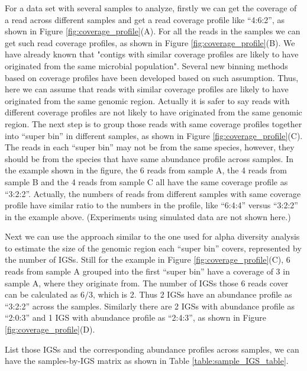 For a data set with several samples to analyze, firstly we can get the coverage of a read across different samples and get a read coverage
profile like ``4:6:2'', as shown in Figure \ref{fig:coverage_profile}(A). 
For all the reads in the samples we can get such read coverage profiles, as 
shown in Figure \ref{fig:coverage_profile}(B). 
We have already known that "contigs with similar coverage profiles are likely
to have originated from the same microbial population"\cite{Imelfort2014}.
Several new binning methods based on coverage profiles have been developed
based on such assumption\cite{Albertsen2013,Karlsson2013,Alneberg2014,Nielsen2014,Imelfort2014}.
Thus, here we can assume that reads with similar coverage profiles are 
likely to have originated from the same genomic region. Actually it is safer to 
say reads with different coverage profiles are not likely to have originated from
the same genomic region. The next step is to group those reads with same
coverage profiles together into ``super bin'' in different samples, as shown 
in Figure \ref{fig:coverage_profile}(C). The reads in each ``super bin'' may 
not be from the same species, however, they should be from the species that have
same abundance profile across samples. In the example shown in the figure,
the 6 reads from sample A, the 4 reads from sample B and the 4 reads from
sample C all have the same coverage profile as ``3:2:2''. Actually, the 
numbers of reads from different samples with same coverage profile have 
similar ratio to the numbers in the profile, like ``6:4:4''
versus ``3:2:2'' in the example above. (Experiments using simulated data are not
shown here.)
 
Next we can use the approach similar to the one used for alpha diversity analysis
to estimate the size of the genomic region each ``super bin'' covers, represented
by the number of IGSs. Still for the example in Figure \ref{fig:coverage_profile}(C),
6 reads from sample A grouped into the first ``super bin'' have a coverage of 3 
in sample A, where they originate from. The number of IGSs those 6 reads cover can be calculated as $6/3$, which is 2. 
Thus 2 IGSs have an abundance profile as ``3:2:2'' across the samples.
Similarly there are 2 IGSs with abundance profile as ``2:0:3'' and 1 IGS 
with abundance profile as ``2:4:3'', as shown in Figure \ref{fig:coverage_profile}(D).

List those IGSs and the corresponding abundance profiles across samples,
we can have the samples-by-IGS matrix as shown in Table \ref{table:sample_IGS_table}.


